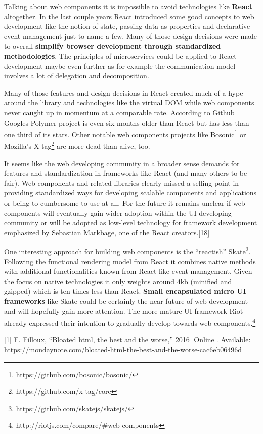 \documentclass[]{article}
\begin{document}
Talking about web components it is impossible to avoid technologies like
\textbf{React} altogether. In the last couple years React introduced
some good concepts to web development like the notion of state, passing
data as properties and declarative event management just to name a few.
Many of those design decisions were made to overall \textbf{simplify
browser development through standardized methodologies}. The principles
of microservices could be applied to React development maybe even
further as for example the communication model involves a lot of
delegation and decomposition.

Many of those features and design decisions in React created much of a
hype around the library and technologies like the virtual DOM while web
components never caught up in momentum at a comparable rate. According
to Github Googles Polymer project is even six months older than React
but has less than one third of its stars. Other notable web components
projects like Bosonic\footnote{https://github.com/bosonic/bosonic/} or
Mozilla's X-tag\footnote{https://github.com/x-tag/core} are more dead
than alive, too.

It seems like the web developing community in a broader sense demands
for features and standardization in frameworks like React (and many
others to be fair). Web components and related libraries clearly missed
a selling point in providing standardized ways for developing scalable
components and applications or being to cumbersome to use at all. For
the future it remains unclear if web components will eventually gain
wider adoption within the UI developing community or will be adopted as
low-level technology for framework development emphasized by Sebastian
Markbage, one of the React creators.{[}18{]}

One interesting approach for building web components is the ``reactish''
Skate\footnote{https://github.com/skatejs/skatejs/}. Following the
functional rendering model from React it combines native methods with
additional functionalities known from React like event management. Given
the focus on native technologies it only weights around 4kb (minified
and gzipped) which is ten times less than React. \textbf{Small
encapsulated micro UI frameworks} like Skate could be certainly the near
future of web development and will hopefully gain more attention. The
more mature UI framework Riot already expressed their intention to
gradually develop towards web components.\footnote{http://riotjs.com/compare/\#web-components}

\hypertarget{refs}{}
\hypertarget{ref-Filloux2016}{}
{[}1{]} F. Filloux, ``Bloated html, the best and the worse,'' 2016
{[}Online{]}. Available:
\url{https://mondaynote.com/bloated-html-the-best-and-the-worse-cac6eb06496d}
\end{document}
